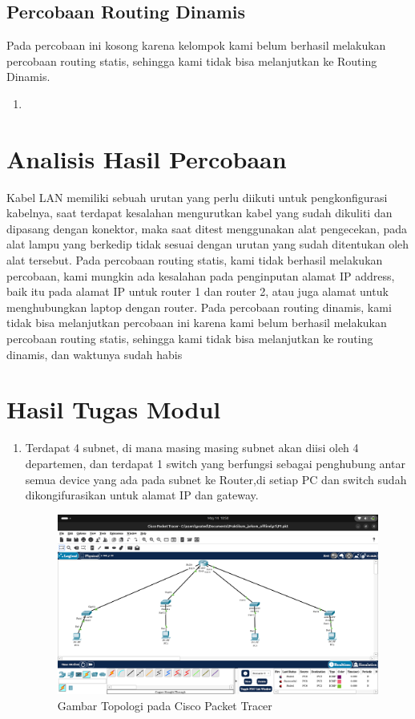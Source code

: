 \subsection{Percobaan Routing Dinamis}
Pada percobaan ini kosong karena kelompok kami belum berhasil melakukan percobaan routing statis,
sehingga kami tidak bisa melanjutkan ke Routing Dinamis.
\begin{enumerate}
    \item 
\end{enumerate}

\section{Analisis Hasil Percobaan}
Kabel LAN memiliki sebuah urutan yang perlu diikuti untuk pengkonfigurasi kabelnya, saat terdapat kesalahan
mengurutkan kabel yang sudah dikuliti dan dipasang dengan konektor, maka saat ditest menggunakan alat 
pengecekan, pada alat lampu yang berkedip tidak sesuai dengan urutan yang sudah ditentukan oleh alat tersebut.
Pada percobaan routing statis, kami tidak berhasil melakukan percobaan, kami mungkin ada kesalahan pada penginputan 
alamat IP address, baik itu pada alamat IP untuk router 1 dan router 2, atau juga alamat untuk menghubungkan
laptop dengan router. Pada percobaan routing dinamis, kami tidak bisa melanjutkan percobaan ini karena kami belum berhasil
melakukan percobaan routing statis, sehingga kami tidak bisa melanjutkan ke routing dinamis, dan waktunya
sudah habis
\section{Hasil Tugas Modul}
\begin{enumerate}
    \item Terdapat 4 subnet, di mana masing masing subnet akan diisi oleh 4 departemen, dan terdapat 1 switch
    yang berfungsi sebagai penghubung antar semua device yang ada pada subnet ke Router,di setiap PC dan switch
    sudah dikongifurasikan untuk alamat IP dan gateway. 
	\begin{figure}[H]
		\centering
		\includegraphics[width=0.5\linewidth]{cisco.png}
		\caption{Gambar Topologi pada Cisco Packet Tracer}
		\label{fig:gambar1}
	\end{figure}
\end{enumerate}



